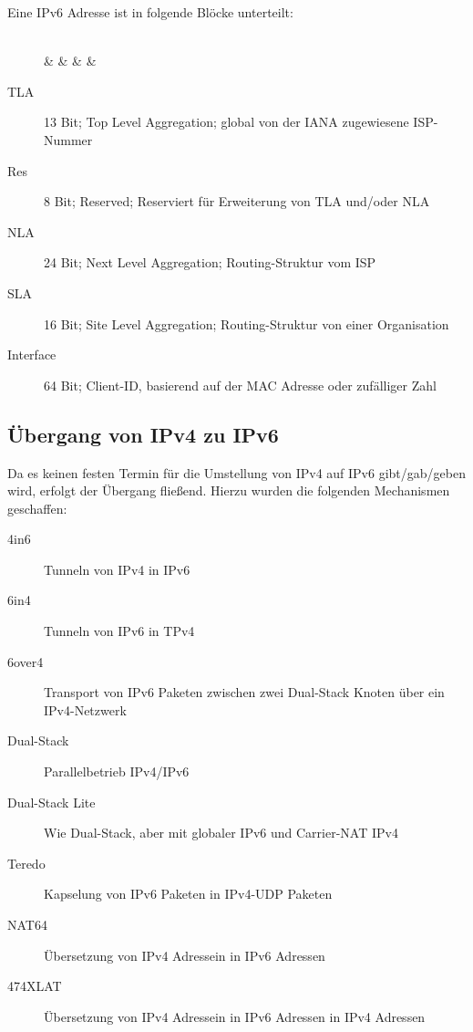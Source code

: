 \documentclass[a4paper, 11pt, accentcolor = tud3b]{tudreport}
\begin{document}
	            Eine IPv6 Adresse ist in folgende Blöcke unterteilt:
	            \begin{figure}[H]
	            	\centering
	            	\begin{bytefield}[bitwidth = 7pt]{64}
	            		 \\
	            		 &  &  &  &  \\
	            	\end{bytefield}
	            \end{figure}
	            \begin{description}
	            	\item[TLA] 13 Bit; Top Level Aggregation; global von der IANA zugewiesene ISP-Nummer
	            	\item[Res] 8 Bit; Reserved; Reserviert für Erweiterung von TLA und/oder NLA
	            	\item[NLA] 24 Bit; Next Level Aggregation; Routing-Struktur vom ISP
	            	\item[SLA] 16 Bit; Site Level Aggregation; Routing-Struktur von einer Organisation
	            	\item[Interface] 64 Bit; Client-ID, basierend auf der MAC Adresse oder zufälliger Zahl
	            \end{description}

            \subsection{Übergang von IPv4 zu IPv6}
                Da es keinen festen Termin für die Umstellung von IPv4 auf IPv6 gibt/gab/geben wird, erfolgt der Übergang fließend. Hierzu wurden die folgenden Mechanismen geschaffen:
                \begin{description}
                	\item[4in6] Tunneln von IPv4 in IPv6
                	\item[6in4] Tunneln von IPv6 in TPv4
                	\item[6over4] Transport von IPv6 Paketen zwischen zwei Dual-Stack Knoten über ein IPv4-Netzwerk
                	\item[Dual-Stack] Parallelbetrieb IPv4/IPv6
                	\item[Dual-Stack Lite] Wie Dual-Stack, aber mit globaler IPv6 und Carrier-NAT IPv4
                	\item[Teredo] Kapselung von IPv6 Paketen in IPv4-UDP Paketen
                	\item[NAT64] Übersetzung von IPv4 Adressein in IPv6 Adressen
                	\item[474XLAT] Übersetzung von IPv4 Adressein in IPv6 Adressen in IPv4 Adressen
                \end{description}
\end{document}
